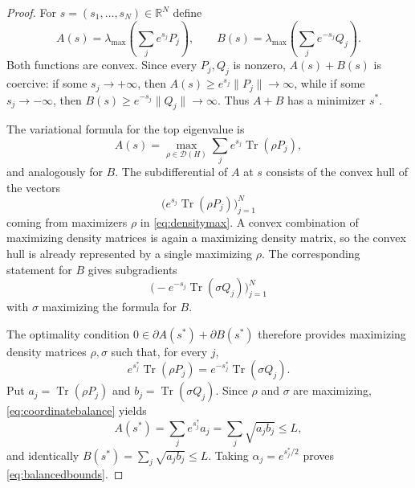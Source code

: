 \documentclass[11pt]{article}
\newcommand{\R}{\mathbb R}
\newcommand{\Dens}{\mathcal D}
\newcommand{\Tr}{\operatorname{Tr}}
\begin{document}
\begin{proof}
For $s=(s_1,\ldots,s_N)\in\R^N$ define
\[
 A(s)=\lambda_{\max}\!\left(\sum_j e^{s_j}P_j\right),\qquad
 B(s)=\lambda_{\max}\!\left(\sum_j e^{-s_j}Q_j\right).
\]
Both functions are convex.  Since every $P_j,Q_j$ is nonzero,
$A(s)+B(s)$ is coercive: if some $s_j\to+\infty$, then
$A(s)\geq e^{s_j}\|P_j\|\to\infty$, while if some
$s_j\to-\infty$, then $B(s)\geq e^{-s_j}\|Q_j\|\to\infty$.
Thus $A+B$ has a minimizer $s^*$.

The variational formula for the top eigenvalue is
\begin{equation}\label{eq:densitymax}
 A(s)=\max_{\rho\in\Dens(H)}
       \sum_j e^{s_j}\Tr(\rho P_j),
\end{equation}
and analogously for $B$.  The subdifferential of $A$ at $s$ consists of
the convex hull of the vectors
\[
 \big(e^{s_j}\Tr(\rho P_j)\big)_{j=1}^N
\]
coming from maximizers $\rho$ in \eqref{eq:densitymax}.  A convex
combination of maximizing density matrices is again a maximizing density
matrix, so the convex hull is already represented by a single maximizing
$\rho$.  The corresponding statement for $B$ gives subgradients
\[
 \big(-e^{-s_j}\Tr(\sigma Q_j)\big)_{j=1}^N
\]
with $\sigma$ maximizing the formula for $B$.

The optimality condition $0\in\partial A(s^*)+\partial B(s^*)$ therefore
provides maximizing density matrices $\rho,\sigma$ such that, for every $j$,
\begin{equation}\label{eq:coordinatebalance}
 e^{s_j^*}\Tr(\rho P_j)
 =e^{-s_j^*}\Tr(\sigma Q_j).
\end{equation}
Put $a_j=\Tr(\rho P_j)$ and $b_j=\Tr(\sigma Q_j)$.  Since $\rho$ and
$\sigma$ are maximizing, \eqref{eq:coordinatebalance} yields
\[
 A(s^*)=\sum_j e^{s_j^*}a_j
       =\sum_j\sqrt{a_jb_j}\leq L,
\]
and identically $B(s^*)=\sum_j\sqrt{a_jb_j}\leq L$.
Taking $\alpha_j=e^{s_j^*/2}$ proves \eqref{eq:balancedbounds}.
\end{proof}
\end{document}
